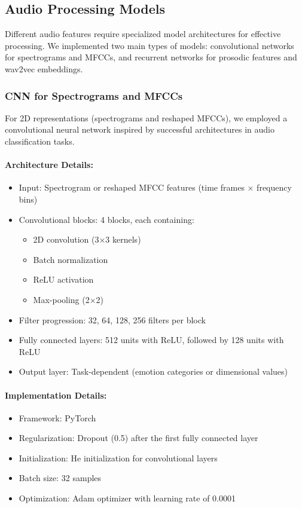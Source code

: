 \documentclass[12pt]{article}
\begin{document}
\subsection{Audio Processing Models}
Different audio features require specialized model architectures for effective processing. We implemented two main types of models: convolutional networks for spectrograms and MFCCs, and recurrent networks for prosodic features and wav2vec embeddings.

\subsubsection{CNN for Spectrograms and MFCCs}
For 2D representations (spectrograms and reshaped MFCCs), we employed a convolutional neural network inspired by successful architectures in audio classification tasks.

\paragraph{Architecture Details:}
\begin{itemize}
    \item Input: Spectrogram or reshaped MFCC features (time frames × frequency bins)
    \item Convolutional blocks: 4 blocks, each containing:
    \begin{itemize}
        \item 2D convolution (3×3 kernels)
        \item Batch normalization
        \item ReLU activation
        \item Max-pooling (2×2)
    \end{itemize}
    \item Filter progression: 32, 64, 128, 256 filters per block
    \item Fully connected layers: 512 units with ReLU, followed by 128 units with ReLU
    \item Output layer: Task-dependent (emotion categories or dimensional values)
\end{itemize}

\paragraph{Implementation Details:}
\begin{itemize}
    \item Framework: PyTorch
    \item Regularization: Dropout (0.5) after the first fully connected layer
    \item Initialization: He initialization for convolutional layers
    \item Batch size: 32 samples
    \item Optimization: Adam optimizer with learning rate of 0.0001
\end{itemize}
\end{document}
